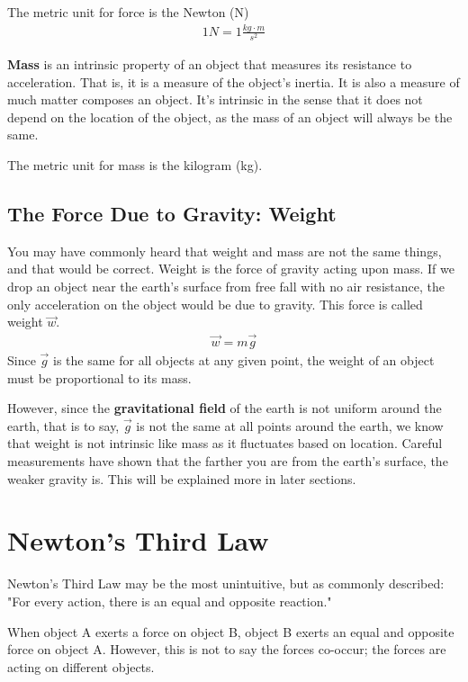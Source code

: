 \documentclass[11pt]{article}
\begin{document}
The metric unit for force is the Newton (N)
\begin{align*}
    1 N = 1 \frac{kg \cdot m}{s^2}
\end{align*}

\textbf{Mass} is an intrinsic property of an object that measures its resistance to acceleration. That is, it is a measure of the object's inertia. It is also a measure of much matter composes an object. It's intrinsic in the sense that it does not depend on the location of the object, as the mass of an object will always be the same.

The metric unit for mass is the kilogram (kg).

\subsection{The Force Due to Gravity: Weight}

You may have commonly heard that weight and mass are not the same things, and that would be correct. Weight is the force of gravity acting upon mass. If we drop an object near the earth's surface from free fall with no air resistance, the only acceleration on the object would be due to gravity. This force is called weight $\Vec{w}$.
\begin{align*}
    \Vec{w} = m\Vec{g}
\end{align*}
Since $\Vec{g}$ is the same for all objects at any given point, the weight of an object must be proportional to its mass. 

However, since the \textbf{gravitational field} of the earth is not uniform around the earth, that is to say, $\Vec{g}$ is not the same at all points around the earth, we know that weight is not intrinsic like mass as it fluctuates based on location. Careful measurements have shown that the farther you are from the earth's surface, the weaker gravity is. This will be explained more in later sections.

\section{Newton's Third Law}

Newton's Third Law may be the most unintuitive, but as commonly described: "For every action, there is an equal and opposite reaction." 

When object A exerts a force on object B, object B exerts an equal and opposite force on object A. However, this is not to say the forces co-occur; the forces are acting on different objects. 
\end{document}
